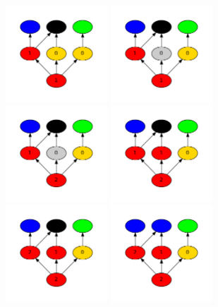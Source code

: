 \documentclass[12pt]{article}
\begin{document}
\begin{figure}
\includegraphics[width=1.5in]{tutorial_1/dot17.pdf}
\includegraphics[width=1.5in]{tutorial_1/dot18.pdf}
\includegraphics[width=1.5in]{tutorial_1/dot19.pdf}
\includegraphics[width=1.5in]{tutorial_1/dot20.pdf}
\includegraphics[width=1.5in]{tutorial_1/dot21.pdf}
\includegraphics[width=1.5in]{tutorial_1/dot22.pdf}

\end{figure}
\end{document}
